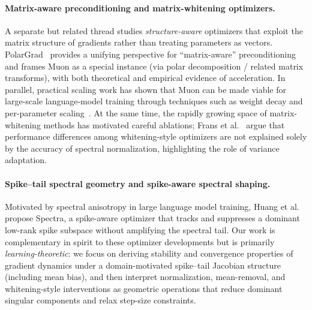 \paragraph{Matrix-aware preconditioning and matrix-whitening optimizers.}
A separate but related thread studies \emph{structure-aware} optimizers that exploit
the matrix structure of gradients rather than treating parameters as vectors.
PolarGrad~\cite{lau2025polargrad} provides a unifying perspective for ``matrix-aware''
preconditioning and frames Muon as a special instance (via polar decomposition / related
matrix transforms), with both theoretical and empirical evidence of acceleration.
In parallel, practical scaling work has shown that Muon can be made viable for large-scale
language-model training through techniques such as weight decay and per-parameter scaling~\cite{liu2025muonscalable}.
At the same time, the rapidly growing space of matrix-whitening methods has motivated
careful ablations; Frans et al.~\cite{frans2025matrixwhitening} argue that performance
differences among whitening-style optimizers are not explained solely by the accuracy
of spectral normalization, highlighting the role of variance adaptation.

\paragraph{Spike--tail spectral geometry and spike-aware spectral shaping.}
Motivated by spectral anisotropy in large language model training, Huang et al.~\cite{huang2026spectra}
propose Spectra, a spike-aware optimizer that tracks and suppresses a dominant low-rank spike
subspace without amplifying the spectral tail.
Our work is complementary in spirit to these optimizer developments but is primarily
\emph{learning-theoretic}: we focus on deriving stability and convergence properties of
gradient dynamics under a domain-motivated spike--tail Jacobian structure (including mean bias),
and then interpret normalization, mean-removal, and whitening-style interventions
as geometric operations that reduce dominant singular components and relax step-size constraints.